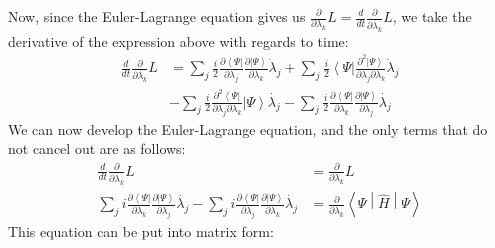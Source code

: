 \documentclass{aux/ttuthes2007}
\newcommand{\bra}[1]{\ensuremath{\left\langle#1\right\vert}}
\newcommand{\ket}[1]{\ensuremath{\left|#1\right\rangle}}
\newcommand{\sandwich}[3]{\left< #1 \middle\vert #2 \middle\vert #3 \right>}
\newcommand{\ddt}{\frac{d}{dt}}
\newcommand{\pd}[1]{\frac{\partial}{\partial #1}}
\newcommand{\kpp}[1]{\frac{\partial \ket\Psi}{\partial #1}}
\newcommand{\bpp}[1]{\frac{\partial \bra\Psi}{\partial #1}}
\newcommand{\kppd}[2]{\frac{\partial^{2} \ket\Psi}{\partial #1 \partial #2}}
\newcommand{\bppd}[2]{\frac{\partial^{2} \bra\Psi}{\partial #1 \partial #2}}
\begin{document}
%
Now, since the Euler-Lagrange equation gives us $\pd{\lambda_k} L = \ddt \pd{\dot {\lambda_k}} L$, we take the derivative of the expression above with regards to time:
%
\begin{equation*}
	\begin{split}
		\ddt \pd{\dot{\lambda_k}} L &=
		\sum_j \frac{i}{2}\bpp{\lambda_j}{\kpp {\lambda_k}} \dot \lambda_j
	+	\sum_j \frac{i}{2}\bra{\Psi}{\kppd {\lambda_j}{\lambda_k}} \dot \lambda_j \\
    	&- 	\sum_j \frac{i}{2}{\bppd{\lambda_j}{\lambda_k}}\ket{\Psi}\dot{\lambda_j}
	- 	\sum_j \frac{i}{2}{\bpp{\lambda_k}}\kpp{\lambda_j}\dot{\lambda_j}
	\end{split}
\end{equation*}
%
We can now develop the Euler-Lagrange equation, and the only terms that do not cancel out are as follows:
%
\begin{equation*}
	\begin{split}
		\ddt \pd{\dot{\lambda_k}} L 
	&=	\pd{\lambda_k} L
	\\
	 	\sum_j i \bpp{\lambda_k} \kpp{\lambda_j}\dot{\lambda_j}
	-	\sum_j i \bpp{\lambda_j} \kpp{\lambda_k}\dot{\lambda_j}
	&= 	\pd{\lambda_k}\sandwich{\Psi}{\hat H}{\Psi}
	\end{split}
\end{equation*}
%
This equation can be put into matrix form:
%
\end{document}
